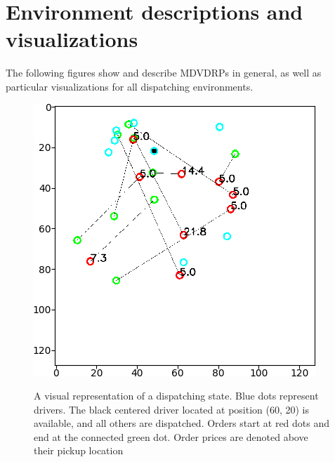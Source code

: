 \section{Environment descriptions and visualizations}

The following figures show and describe MDVDRPs in general, as well as particular visualizations for all dispatching environments. 

\begin{figure}[H]
\begin{floatrow}
\centering
\includegraphics[width=.75\linewidth]{sections/mddqn/figures/policy_5min_cropped.png}\label{fig:simulacrum}
\caption{A visual representation of a dispatching state. Blue dots represent drivers. The black centered driver located at position (60, 20) is available, and all others are dispatched. Orders start at red dots and end at the connected green dot. Order prices are denoted above their pickup location}
\end{floatrow}
\end{figure}

